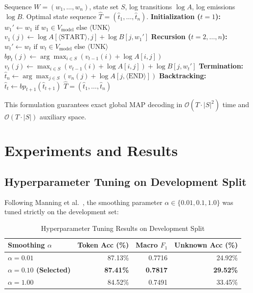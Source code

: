\documentclass[conference]{IEEEtran}
\begin{document}
\begin{algorithm}[htbp]
\caption{Log-Space Viterbi Trellis Decoding}
\label{alg:viterbi}
\begin{algorithmic}[1]
\REQUIRE Sequence $W = (w_1, \dots, w_n)$, state set $S$, log transitions $\log A$, log emissions $\log B$.
\ENSURE Optimal state sequence $\hat{T} = (\hat{t}_1, \dots, \hat{t}_n)$.
\STATE \textbf{Initialization ($t = 1$):}
    \STATE $w_1' \leftarrow w_1 \text{ if } w_1 \in V_{\text{model}} \text{ else } \langle\text{UNK}\rangle$
    \STATE $v_1(j) \leftarrow \log A[\langle\text{START}\rangle, j] + \log B[j, w_1']$
\ENDFOR
\STATE \textbf{Recursion ($t = 2, \dots, n$):}
    \STATE $w_t' \leftarrow w_t \text{ if } w_t \in V_{\text{model}} \text{ else } \langle\text{UNK}\rangle$
        \STATE $bp_t(j) \leftarrow \arg\max_{i \in S} \left( v_{t-1}(i) + \log A[i, j] \right)$
        \STATE $v_t(j) \leftarrow \max_{i \in S} \left( v_{t-1}(i) + \log A[i, j] \right) + \log B[j, w_t']$
    \ENDFOR
\ENDFOR
\STATE \textbf{Termination:}
\STATE $\hat{t}_n \leftarrow \arg\max_{j \in S} \left( v_n(j) + \log A[j, \langle\text{END}\rangle] \right)$
\STATE \textbf{Backtracking:}
    \STATE $\hat{t}_t \leftarrow bp_{t+1}(\hat{t}_{t+1})$
\ENDFOR
\RETURN $\hat{T} = (\hat{t}_1, \dots, \hat{t}_n)$
\end{algorithmic}
\end{algorithm}

This formulation guarantees exact global MAP decoding in $\mathcal{O}(T \cdot |S|^2)$ time and $\mathcal{O}(T \cdot |S|)$ auxiliary space.

\section{Experiments and Results}
\label{sec:experiments}

\subsection{Hyperparameter Tuning on Development Split}
Following Manning et al.~\cite{manning2008introduction}, the smoothing parameter $\alpha \in \{0.01, 0.1, 1.0\}$ was tuned strictly on the development set:

\begin{table}[htbp]
\caption{Hyperparameter Tuning Results on Development Split}
\label{tab:tuning}
\centering
\begin{tabular}{lrrr}
\toprule
\textbf{Smoothing} $\alpha$ & \textbf{Token Acc (\%)} & \textbf{Macro} $F_1$ & \textbf{Unknown Acc (\%)} \\
\midrule
$\alpha = 0.01$ & 87.13\% & 0.7716 & 24.92\% \\
\textbf{$\alpha = 0.10$ (Selected)} & \textbf{87.41\%} & \textbf{0.7817} & \textbf{29.52\%} \\
$\alpha = 1.00$ & 84.52\% & 0.7491 & 33.45\% \\
\bottomrule
\end{tabular}
\end{table}
\end{document}
